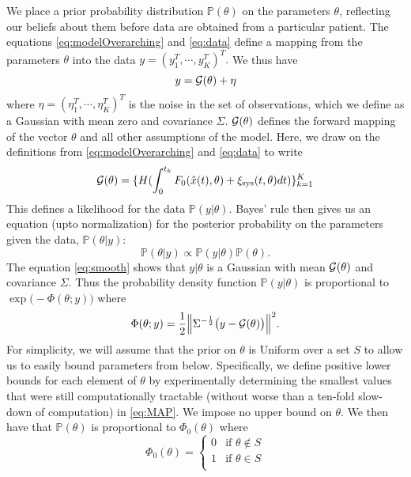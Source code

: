 \documentclass[10pt,letterpaper]{article}
\newcommand{\bbP}{\mathbb{P}}
\newcommand{\xis}{\xi_{\rm sys}}
\begin{document}
We place a prior probability distribution
$\bbP(\theta)$ on the parameters $\theta$, reflecting our beliefs
about them before data are obtained from a particular patient.
The equations \eqref{eq:modelOverarching} and \eqref{eq:data} define
a mapping from the parameters $\theta$ 
into the data $y=(y_1^T,\cdots, y_K^T)^T.$ We thus
have
\begin{equation}
\label{eq:smooth}
y={\cal G}(\theta)+\eta
\end{equation}
where $\eta=(\eta_1^T,\cdots, \eta_K^T)^T$ is the noise in the set of observations, which
we define as a Gaussian with mean zero and covariance $\Sigma$. ${\cal G}(\theta)$ defines
the forward mapping of the vector $\theta$ and all other assumptions of the model. Here, we draw on
the definitions from \eqref{eq:modelOverarching} and \eqref{eq:data} to write
\begin{equation}
\label{eq:G}
{\cal G}(\theta)=\{H(\int_{0}^{t_k}{F_0(\hat{x}(t),\theta) + \xis(t,\theta) dt})\}_{k=1}^K
\end{equation}
This defines a likelihood for the data $\bbP(y|\theta).$
Bayes' rule then gives us an equation (upto normalization) for the
posterior probability on the parameters given the data, $\bbP(\theta|y)$: 
\begin{equation}
\label{eq:bayes}
\bbP(\theta|y) \propto \bbP(y|\theta)\bbP(\theta).
\end{equation}
The equation \eqref{eq:smooth} shows that $y|\theta$ is a Gaussian
with mean ${\cal G}(\theta)$ and covariance $\Sigma$.
Thus the probability density function $\bbP(y|\theta)$ is proportional to
$\exp\bigl(-\Phi(\theta;y)\bigr)$
where
\begin{equation}
\label{eq:misfit}
\Phi(\theta;y)=\frac{1}{2}\Bigl\|\Sigma^{-\frac12}\bigl(y-{\mathcal G}(\theta)\bigr)\Bigr\|^2.
\end{equation}
For simplicity, we will assume that the prior on $\theta$ is Uniform over a set $S$ to allow us to easily bound parameters from below. Specifically, we define positive lower bounds for each element of $\theta$ by experimentally determining the smallest values that were still computationally tractable (without worse than a ten-fold slow-down of computation) in \eqref{eq:MAP}. We impose no upper bound on $\theta$.
We then have that $\bbP(\theta)$ is proportional to $\Phi_0(\theta)$ where
\begin{equation}
\label{eq:misfit}
  \Phi_0(\theta) =
  \begin{cases}
       0 & \text{if $\theta \notin S$} \\
       1 & \text{if $\theta \in S$} \\
  \end{cases}
\end{equation}
\end{document}
